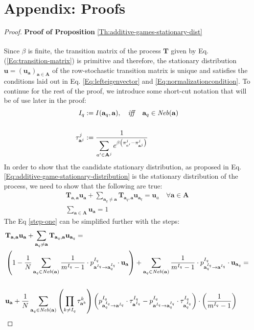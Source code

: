 \documentclass[11pt]{article}
\theoremstyle{plainCl1}
\theoremstyle{plainCl2}
\newcommand{\A}{\mathbf{A}}
\newcommand{\abf}{\mathbf{a}}
\newcommand{\T}{\mathbf{T}}
\newcommand{\ubf}{\mathbf{u}}
\begin{document}
\section*{Appendix: Proofs}
\label{Section:Appendix}
\begin{proof}
\textbf{Proof of Proposition} \ref{Th:additive-games-stationary-dist} \\ \\ 
Since $\beta$ is finite, the transition matrix of the process $\T$ given by Eq. (\ref{Eq:transition-matrix}) is primitive and therefore, the stationary distribution $\ubf = (\ubf_\abf)_{\abf \in \A}$ of the row-stochastic transition matrix is unique and satisfies the conditions laid out in Eq. \ref{Eq:lefteigenvector} and \ref{Eq:normalizationcondition}. To continue for the rest of the proof, we introduce some short-cut notation that will be of use later in the proof:\\
\begin{align}
I_{q} &:= I(\abf_q,\abf), \quad \mathit{iff} \quad \abf_q \in \mathit{Neb}(\abf) \\ \notag \\ 
\label{Eq:shortcut-tau}
\tau^j_{\abf^j} &:= \frac{1}{\displaystyle \sum_{a' \in \A^j} e^{\beta \left( \pi^j_{a'} -  \pi^j_{\abf^j} \right) }} 
\end{align}
\noindent In order to show that the candidate stationary distribution, as proposed in Eq. \ref{Eq:additive-game-stationary-distribution} is the stationary distribution of the process, we need to show that the following are true:
\begin{eqnarray}
\label{step-one}
\T_{\abf,\abf} \ubf_\abf  + \sum_{\abf_q \neq \abf} \T_{\abf_q, \abf} \ubf_{\abf_q}= \ubf_a \quad \forall \abf \in \A \\ 
\label{step-two}
\sum_{\abf \in \A} \ubf_\abf  = 1
\end{eqnarray}
The Eq \ref{step-one} can be simplified further with the steps: 
\begin{align}
&\T_{\abf,\abf} \ubf_\abf  + \sum_{\abf_q \neq \abf} \T_{\abf_q, \abf} \ubf_{\abf_q}= \\
& \left( 1 - \frac{1}{N} \sum_{\abf_q \in \mathit{Neb}(\abf)} \frac{1}{m^{I_q}-1} \cdot p^{I_q}_{\abf^{I_q} \to \abf^{I_q}_q} \cdot \ubf_{\abf} \right) + \sum_{\abf_q \in \mathit{Neb}(\abf)}  \frac{1}{m^{I_q}-1} \cdot p^{I_q}_{\abf^{I_q}_q \to \abf^{I_q}} \cdot \ubf_{\abf_q} = \\ \notag \\
\label{eq:important-step}
& \ubf_\abf +  \frac{1}{N} \sum_{\abf_q \in \mathit{Neb}(\abf)} \left( \prod_{k \neq I_q} \tau^k_{\abf^k} \right) \left( p^{I_q}_{\abf^{I_q}_q \to \abf^{I_q}} \cdot \tau^{I_q}_{\abf^{I_q}} -  p^{I_q}_{\abf^{I_q} \to \abf^{I_q}_q} \cdot \tau^{I_q}_{\abf^{I_q}_q} \right) \cdot \left(  \frac{1}{m^{I_q}-1} \right)

\end{align}
\end{proof}
\end{document}
